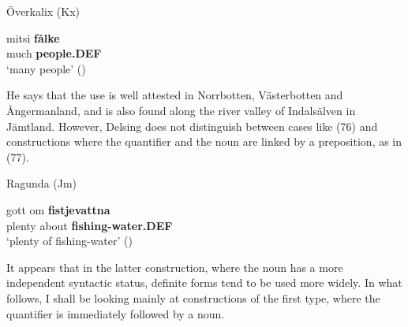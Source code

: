 \label{bkm:Ref64458018}\label{bkm:Ref159664857}Överkalix (Kx) 



 \ea\label{}
\gll mitsi  \textbf{fålke}\\


much  \textbf{people.DEF}\\

\glt ‘many people’ (\citet[17]{Delsing2003a})

\z

He says that the use is well attested in Norrbotten, Västerbotten and Ångermanland, and is also found along the river valley of Indalsälven in Jämtland. However, Delsing does not distinguish between cases like (76) and constructions where the quantifier and the noun are linked by a preposition, as in (77).


\item 

Ragunda (Jm)



 \ea\label{}
\gll gott  om  \textbf{fistjevattna} \\


plenty  about  \textbf{fishing-water.DEF} \\

\glt ‘plenty of fishing-water’ (\citet[18]{Delsing2003a})

\z

It appears that in the latter construction, where the noun has a more independent syntactic status, definite forms tend to be used more widely. In what follows, I shall be looking mainly at constructions of the first type, where the quantifier is immediately followed by a noun. 


